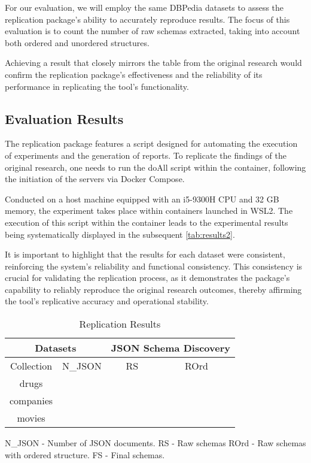 \documentclass[sigconf, nonacm]{acmart}
\begin{document}
For our evaluation, we will employ the same DBPedia datasets to assess the replication package's ability to accurately reproduce results. The focus of this evaluation is to count the number of raw schemas extracted, taking into account both ordered and unordered structures.

Achieving a result that closely mirrors the table from the original research would confirm the replication package's effectiveness and the reliability of its performance in replicating the tool's functionality.

\subsection{Evaluation Results}

The replication package features a script designed for automating the execution of experiments and the generation of reports. To replicate the findings of the original research, one needs to run the doAll script within the container, following the initiation of the servers via Docker Compose. 

Conducted on a host machine equipped with an i5-9300H CPU and 32 GB memory, the experiment takes place within containers launched in WSL2. The execution of this script within the container leads to the experimental results being systematically displayed in the subsequent \autoref{tab:results2}. 

It is important to highlight that the results for each dataset were consistent, reinforcing the system's reliability and functional consistency. This consistency is crucial for validating the replication process, as it demonstrates the package's capability to reliably reproduce the original research outcomes, thereby affirming the tool's replicative accuracy and operational stability.

\begin{table}[hb]%
	\centering
	\caption{Replication Results}
	\label{tab:results2}
	\begin{tabular}{|c|c|c|c|}
		\hline
		\multicolumn{2}{|c|}{Datasets} & \multicolumn{2}{c|}{JSON Schema Discovery} \\
		\hline
		Collection                     & N\_JSON                                    & RS          & ROrd  \\
		\hline
		drugs                          & \drugsCount                                       & \drugsUnordered        & \drugsOrdered  \\
		\hline
		companies                      & \companiesCount                                      & \companiesUnordered       & \companiesOrdered \\
		\hline
		movies                         & \moviesCount                                      & \moviesUnordered       & \moviesOrdered  \\
		\hline
	\end{tabular}
	\parbox{0.4\textwidth}{
		\raggedright\footnotesize
		N\_JSON - Number of JSON documents. RS - Raw schemas \newline
		ROrd - Raw schemas with ordered structure. FS - Final schemas.
	}
\end{table}
\end{document}
